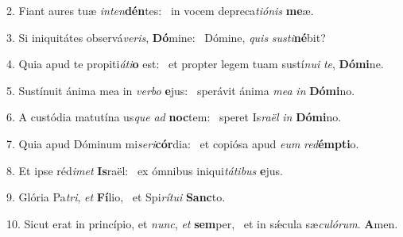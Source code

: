 2. Fiant aures tuæ \textit{in}\textit{ten}\textbf{dén}tes: \ast\  in vocem depreca\textit{ti}\textit{ó}\textit{nis} \textbf{me}æ.\

3. Si iniquitátes observá\textit{ve}\textit{ris}, \textbf{Dó}mine: \ast\  Dómine, \textit{quis} \textit{sus}\textit{ti}\textbf{né}bit?\

4. Quia apud te propiti\textit{á}\textit{ti}\textbf{o} est: \ast\  et propter legem tuam sustí\textit{nu}\textit{i} \textit{te}, \textbf{Dó}\textbf{mi}ne.\

5. Sustínuit ánima mea in \textit{ver}\textit{bo} \textbf{e}jus: \ast\  sperávit ánima \textit{me}\textit{a} \textit{in} \textbf{Dó}\textbf{mi}no.\

6. A custódia matutína us\textit{que} \textit{ad} \textbf{noc}tem: \ast\  speret Is\textit{ra}\textit{ël} \textit{in} \textbf{Dó}\textbf{mi}no.\

7. Quia apud Dóminum mi\textit{se}\textit{ri}\textbf{cór}dia: \ast\  et copiósa apud \textit{e}\textit{um} \textit{red}\textbf{émp}\textbf{ti}o.\

8. Et ipse réd\textit{i}\textit{met} \textbf{Is}raël: \ast\  ex ómnibus iniqui\textit{tá}\textit{ti}\textit{bus} \textbf{e}jus.\

9. Glória Pa\textit{tri}, \textit{et} \textbf{Fí}lio, \ast\  et Spi\textit{rí}\textit{tu}\textit{i} \textbf{Sanc}to.\

10. Sicut erat in princípio, et \textit{nunc}, \textit{et} \textbf{sem}per, \ast\  et in sǽcula sæ\textit{cu}\textit{ló}\textit{rum}. \textbf{A}men.\

